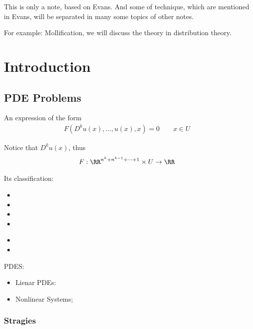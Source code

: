 \documentclass[Total.tex]{subfiles}
\begin{document}
	
	This is only a note, based on Evans. And some of technique, which are mentioned in Evans, will be separated in many some topics of other notes. 
	
	For example: Mollification, we will discuss the theory in distribution theory. 
	\chapter{Introduction}
	
		\section{PDE Problems}
			\begin{Def}
				An expression of the form
				\begin{gather*}
					F(D^k u(x),\dots,u(x),x)=0\qquad x\in U
				\end{gather*}
				
				Notice that $D^k u(x)$, thus 
				\begin{gather*}
					F:\RR^{n^k+n^{k-1}+\dots+1}\times U\rightarrow \RR
				\end{gather*}
			\end{Def}
			
			Its classification:
			\begin{Def}
				\begin{itemize}
					\item 
					\item 
					\item 
					\item 
				\end{itemize}
			\end{Def}
			
			\begin{Def}
				\begin{itemize}
					\item 
					\item 
				\end{itemize}
			\end{Def}
			
			
			PDES:
			\begin{itemize}
				\item Lienar PDEs:
				
				\item Nonlinear Systems;
			\end{itemize}
			
			\subsection{Stragies}
			
\end{document}
